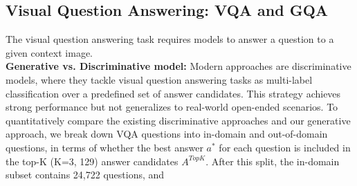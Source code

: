 \documentclass[twocolumn,3p,a4paper,preprint,11pt,margin=2.5cm]{elsarticle}
\begin{document}
\subsection{ Visual Question Answering: VQA and GQA}
The visual question answering task requires models to answer a question to a given context image.\\[0.4 cm]
\textbf{Generative vs. Discriminative model:} Modern approaches are discriminative models, where they tackle visual question answering tasks as multi-label classification over a predefined set of answer
candidates. This strategy achieves strong performance but
not generalizes to real-world open-ended scenarios. To quantitatively compare the existing discriminative approaches
and our generative approach, we break down VQA questions into in-domain and out-of-domain questions, in terms of whether the best answer $a^*$ for each question is included in the top-K (K=3, 129) answer candidates $A^{TopK}$. After this split, the in-domain subset contains 24,722 questions, and 
\vspace*{-10pt}
\end{document}
